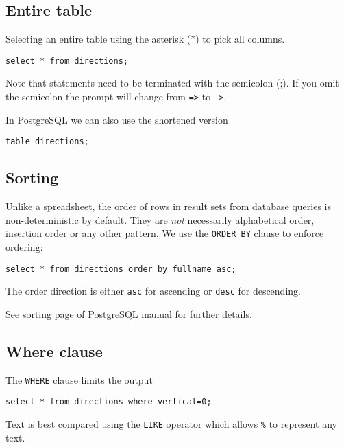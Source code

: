 \subsection{Entire table}\label{entire-table}

Selecting an entire table using the asterisk (*) to pick all columns.

\begin{verbatim}
select * from directions;
\end{verbatim}

Note that statements need to be terminated with the semicolon (;). If
you omit the semicolon the prompt will change from
\texttt{=\textgreater{}} to \texttt{-\textgreater{}}.

In PostgreSQL we can also use the shortened version

\begin{verbatim}
table directions;
\end{verbatim}

\subsection{Sorting}\label{sorting}

Unlike a spreadsheet, the order of rows in result sets from database
queries is non-deterministic by default. They are \emph{not} necessarily
alphabetical order, insertion order or any other pattern. We use the
\texttt{ORDER\ BY} clause to enforce ordering:

\begin{verbatim}
select * from directions order by fullname asc;
\end{verbatim}

The order direction is either \texttt{asc} for ascending or
\texttt{desc} for descending.

See \href{https://www.postgresql.org/docs/13/queries-order.html}{sorting
page of PostgreSQL manual} for further details.

\subsection{Where clause}\label{where-clause}

The \texttt{WHERE} clause limits the output

\begin{verbatim}
select * from directions where vertical=0;
\end{verbatim}

Text is best compared using the \texttt{LIKE} operator which allows
\texttt{\%} to represent any text.

